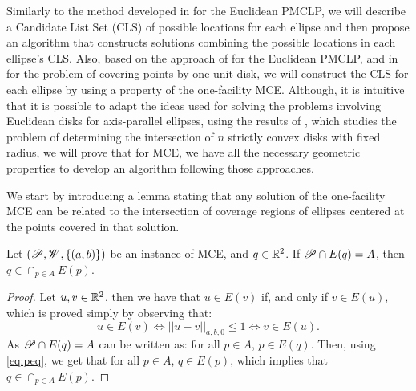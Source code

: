 Similarly to the method developed in \cite{church:1984} for the Euclidean PMCLP, we will describe a Candidate List Set (CLS) of possible locations for each ellipse and then propose an algorithm that constructs solutions combining the possible locations in each ellipse's CLS.
Also, based on the approach of \cite{church:1984} for the Euclidean PMCLP, and in \cite{chazelle:1986} for the problem of covering points by one unit disk, we will construct the CLS for each ellipse by using a property of the one-facility MCE.
Although, it is intuitive that it is possible to adapt the ideas used for solving the problems involving Euclidean disks for axis-parallel ellipses, using the results of \cite{bi}, which studies the problem of determining the intersection of $n$ strictly convex disks with fixed radius, we will prove that for MCE, we have all the necessary geometric properties to develop an algorithm following those approaches.

We start by introducing a lemma stating that any solution of the one-facility MCE can be related to the intersection of coverage regions of ellipses centered at the points covered in that solution. 

\begin{lem}\label{lema:mce-mwc}
	Let $(\mathscr{P}, \mathscr{W}, \{(a, b)\})$ be an instance of MCE, and $q\in \mathbb{R}^2$. If $\mathscr{P} \cap E(q) = A$, then $q \in \cap_{p\in A} E(p)$.
\end{lem}
\begin{proof}
	Let $u, v \in \mathbb{R}^2$, then we have that $u \in E(v)$ if, and only if $v \in E(u)$, which is proved simply by observing that:
	\begin{equation}\label{eq:peq}
	u \in E(v) \Leftrightarrow ||u-v||_{a, b, 0} \le 1 \Leftrightarrow v \in E(u).
	\end{equation}
	As $\mathscr{P} \cap E(q) = A$ can be written as: for all $p \in A$, $p \in E(q)$. Then, using \autoref{eq:peq}, we get that for all $p \in A$, $q \in E(p)$, which implies that $q \in \cap_{p\in A} E(p)$.
\end{proof}





